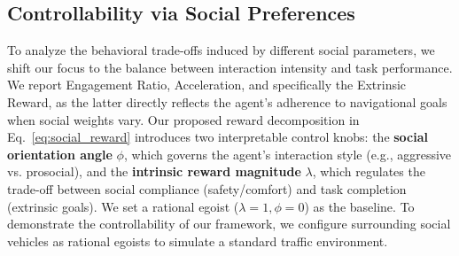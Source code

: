 

\subsection{Controllability via Social Preferences}

To analyze the behavioral trade-offs induced by different social parameters, we shift our focus to the balance between interaction intensity and task performance. We report Engagement Ratio, Acceleration, and specifically the Extrinsic Reward, as the latter directly reflects the agent's adherence to navigational goals when social weights vary. Our proposed reward decomposition in Eq.~\eqref{eq:social_reward} introduces two interpretable control knobs: the \textbf{social orientation angle} $\phi$, which governs the agent's interaction style (e.g., aggressive vs. prosocial), and the \textbf{intrinsic reward magnitude} $\lambda$, which regulates the trade-off between social compliance (safety/comfort) and task completion (extrinsic goals). We set a rational egoist ($\lambda=1, \phi=0$) as the baseline. To demonstrate the controllability of our framework, we configure surrounding social vehicles as rational egoists to simulate a standard traffic environment.

